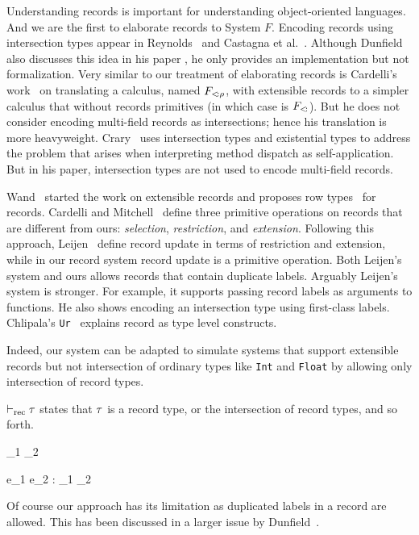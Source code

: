 Understanding records is important for understanding object-oriented languages.
And we are the first to elaborate records to System $ F $. Encoding records
using intersection types appear in Reynolds~\cite{reynolds1997design} and
Castagna et al.~\cite{castagna1995calculus}. Although Dunfield also discusses
this idea in his paper \cite{dunfield2014elaborating}, he only provides an
implementation but not formalization. Very similar to our treatment of
elaborating records is Cardelli's work~\cite{cardelli1992extensible} on
translating a calculus, named $ F_{<\!: \rho}$, with extensible records to a
simpler calculus that without records primitives (in which case is
$ F_{<\!:} $). But he does not consider encoding multi-field records as
intersections; hence his translation is more heavyweight.
Crary~\cite{crary1998simple} uses intersection types and existential types to
address the problem that arises when interpreting method dispatch as
self-application. But in his paper, intersection types are not used to encode
multi-field records.

Wand~\cite{wand1987complete} started the work on extensible records and proposes
row types~\cite{wand1989type} for records. Cardelli and
Mitchell~\cite{cardelli1990operations} define three primitive operations on
records that are different from ours: \emph{selection}, \emph{restriction}, and
\emph{extension}. Following this approach, Leijen~\cite{leijen2005extensible}
define record update in terms of restriction and extension, while in our record
system record update is a primitive operation. Both Leijen's system and ours
allows records that contain duplicate labels. Arguably Leijen's system is
stronger. For example, it supports passing record labels as arguments to
functions. He also shows encoding an intersection type using first-class labels.
Chlipala's \texttt{Ur}~\cite{chlipala2010ur} explains record as type level
constructs.



Indeed, our system can be adapted to simulate systems that support extensible
records but not intersection of ordinary types like \texttt{Int} and
\texttt{Float} by allowing only intersection of record types.

$ \vdash_{\textrm{rec}} \tau $ states that $ \tau $ is a record type, or the intersection of
record types, and so forth.


{\turnsrec \ty_1 \intersects \ty_2}

{\Gamma \turns e_1 \dcomma e_2 : \ty_1 \intersects \ty_2 }

Of course our approach has its limitation as duplicated labels in a record are
allowed. This has been discussed in a larger issue by
Dunfield~\cite{dunfield2014elaborating}.

